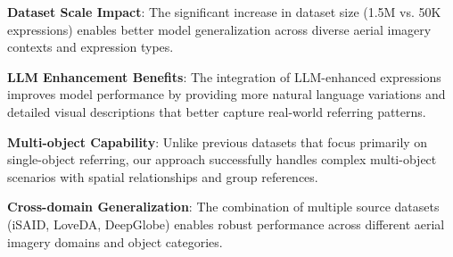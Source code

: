 \textbf{Dataset Scale Impact}: The significant increase in dataset size (1.5M vs. 50K expressions) enables better model generalization across diverse aerial imagery contexts and expression types.

\textbf{LLM Enhancement Benefits}: The integration of LLM-enhanced expressions improves model performance by providing more natural language variations and detailed visual descriptions that better capture real-world referring patterns.

\textbf{Multi-object Capability}: Unlike previous datasets that focus primarily on single-object referring, our approach successfully handles complex multi-object scenarios with spatial relationships and group references.

\textbf{Cross-domain Generalization}: The combination of multiple source datasets (iSAID, LoveDA, DeepGlobe) enables robust performance across different aerial imagery domains and object categories.
